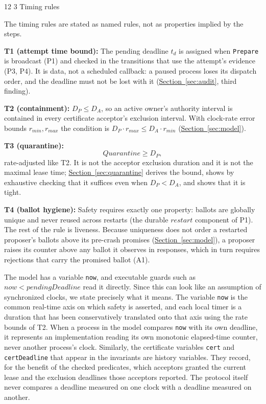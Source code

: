 \documentclass[final,5p,times,twocolumn,number]{elsarticle}
\makeatletter
\newcommand{\code}[1]{\texttt{#1}}
\newcommand{\invitem}[1]{\smallskip\noindent\textbf{#1:} }
\newcommand{\secref}[1]{\hyperref[#1]{Section~\ref*{#1}}}
\renewcommand\subsection{\@startsection{subsection}{2}{\z@}%
           {12\p@ \@plus 6\p@ \@minus 3\p@}%
           {3\p@ \@plus 6\p@ \@minus 3\p@}%
           {\normalfont\normalsize\bfseries}}
\makeatother
\begin{document}
\subsection{Timing rules}

The timing rules are stated as named rules, not as properties implied by the steps.

\invitem{T1 (attempt time bound)}The pending deadline $t_d$ is assigned when \code{Prepare} is broadcast (P1) and checked in the transitions that use the attempt's evidence (P3, P4).  It is data, not a scheduled callback: a paused process loses its dispatch order, and the deadline must not be lost with it (\secref{sec:audit}, third finding).

\invitem{T2 (containment)}$D_P \leq D_A$, so an active owner's authority interval is contained in every certificate acceptor's exclusion interval.  With clock-rate error bounds $r_{min}, r_{max}$ the condition is $D_P \cdot r_{max} \leq D_A \cdot r_{min}$ (\secref{sec:model}).

\invitem{T3 (quarantine)}
\[
  Quarantine \geq D_P,
\]
rate-adjusted like T2.  It is not the acceptor exclusion duration and it is not the maximal lease time; \secref{sec:quarantine} derives the bound, shows by exhaustive checking that it suffices even when $D_P < D_A$, and shows that it is tight.

\invitem{T4 (ballot hygiene)}Safety requires exactly one property: ballots are globally unique and never reused across restarts (the durable $restart$ component of P1).  The rest of the rule is liveness.  Because uniqueness does not order a restarted proposer's ballots above its pre-crash promises (\secref{sec:model}), a proposer raises its counter above any ballot it observes in responses, which in turn requires rejections that carry the promised ballot (A1).

The model has a variable \code{now}, and executable guards such as $now < pendingDeadline$ read it directly.  Since this can look like an assumption of synchronized clocks, we state precisely what it means.  The variable \code{now} is the common real-time axis on which safety is asserted, and each local timer is a duration that has been conservatively translated onto that axis using the rate bounds of T2.  When a process in the model compares \code{now} with its own deadline, it represents an implementation reading its own monotonic elapsed-time counter, never another process's clock.  Similarly, the certificate variables \code{cert} and \code{certDeadline} that appear in the invariants are history variables.  They record, for the benefit of the checked predicates, which acceptors granted the current lease and the exclusion deadlines those acceptors reported.  The protocol itself never compares a deadline measured on one clock with a deadline measured on another.
\end{document}
